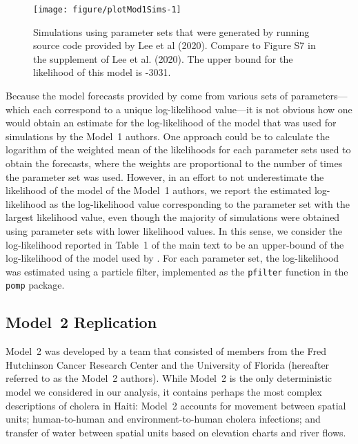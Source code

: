 \begin{knitrout}
\color{fgcolor}\begin{figure}

{\centering \texttt{[image: figure/plotMod1Sims-1]} 

}

\caption[Simulations using parameter sets that were generated by running source code provided by Lee et al (2020)]{Simulations using parameter sets that were generated by running source code provided by Lee et al (2020). Compare to Figure S7 in the supplement of Lee et al. (2020). The upper bound for the likelihood of this model is -3031.}\label{fig:plotMod1Sims}
\end{figure}

\end{knitrout}

Because the model forecasts provided by \cite{lee20} come from various sets of parameters---which each correspond to a unique log-likelihood value---it is not obvious how one would obtain an estimate for the log-likelihood of the model that was used for simulations by the Model~1 authors.
One approach could be to calculate the logarithm of the weighted mean of the likelihoods for each parameter sets used to obtain the forecasts, where the weights are proportional to the number of times the parameter set was used.
However, in an effort to not underestimate the likelihood of the model of the Model~1 authors, we report the estimated log-likelihood as the log-likelihood value corresponding to the parameter set with the largest likelihood value, even though the majority of simulations were obtained using parameter sets with lower likelihood values.
In this sense, we consider the log-likelihood reported in Table~1 of the main text to be an upper-bound of the log-likelihood of the model used by \cite{lee20}.
For each parameter set, the log-likelihood was estimated using a particle filter, implemented as the \texttt{pfilter} function in the \texttt{pomp} package.

\subsection{Model~2 Replication}\label{sec:mod2rep}

Model~2 was developed by a team that consisted of members from the Fred Hutchinson Cancer Research Center and the University of Florida (hereafter referred to as the Model~2 authors).
While Model~2 is the only deterministic model we considered in our analysis, it contains perhaps the most complex descriptions of cholera in Haiti: Model~2 accounts for movement between spatial units; human-to-human and environment-to-human cholera infections; and transfer of water between spatial units based on elevation charts and river flows.

